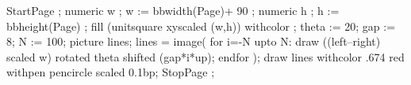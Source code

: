     StartPage ;
    numeric w ; w := bbwidth(Page)+ 90 ;
    numeric h ; h := bbheight(Page) ;
    fill (unitsquare xyscaled (w,h)) withcolor  ;
    theta := 20; gap := 8; N := 100;
    picture lines; lines = image( 
    for i=-N upto N: 
       draw ((left--right) scaled w) rotated theta shifted (gap*i*up); 
    endfor );
    draw lines withcolor .674 red withpen pencircle scaled 0.1bp;
    StopPage ;
\stopuseMPgraphic

\setupbackgrounds[page][background=cover]

\startstandardmakeup
  \raggedcenter
  \vfill {}\setstrut \strut \color[white]{ramp} 
  \blank[2*big] \setstrut \strut \color[white]{test}
  \vfill
\stopstandardmakeup

\setupbackgrounds[page][background=]
